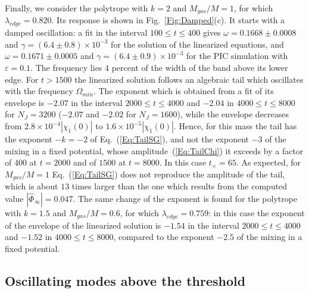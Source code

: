 Finally, we consider the polytrope with $k = 2$ and $M_{gas}/M = 1$, for which $\lambda_{edge} = 0.820$. Its response is shown in Fig.~\ref{Fig:Damped}(c). It starts with a damped oscillation: a fit in the interval $100\leq t\leq 400$ gives $\omega = 0.1668\pm 0.0008$ and $\gamma = (6.4\pm 0.8)\times 10^{-3}$ for the solution of the linearized equations, and $\omega = 0.1671\pm 0.0005$ and $\gamma = (6.4\pm 0.9)\times 10^{-3}$ for the PIC simulation with $\varepsilon = 0.1$. The frequency lies $4$ percent of the width of the band above its lower edge. For $t > 1500$ the linearized solution follows an algebraic tail which oscillates with the frequency $\Omega_{min}$. The exponent which is obtained from a fit of its envelope is $-2.07$ in the interval $2000\leq t\leq 4000$ and $-2.04$ in $4000\leq t\leq 8000$ for $N_J = 3200$ ($-2.07$ and $-2.02$ for $N_J = 1600$), while the envelope decreases from $2.8\times 10^{-4}|\chi_1(0)|$ to $1.6\times 10^{-5}|\chi_1(0)|$. Hence, for this mass the tail has the exponent $-k = -2$ of Eq.~(\ref{Eq:TailSG}), and not the exponent $-3$ of the mixing in a fixed potential, whose amplitude~(\ref{Eq:TailChi}) it exceeds by a factor of $400$ at $t = 2000$ and of $1500$ at $t = 8000$. In this case $t_\times = 65$. As expected, for $M_{gas}/M = 1$ Eq.~(\ref{Eq:TailSG}) does not reproduce the amplitude of the tail, which is about $13$ times larger than the one which results from the computed value $|\hat{\Phi}_\infty| = 0.047$. The same change of the exponent is found for the polytrope with $k = 1.5$ and $M_{gas}/M = 0.6$, for which $\lambda_{edge} = 0.759$: in this case the exponent of the envelope of the linearized solution is $-1.54$ in the interval $2000\leq t\leq 4000$ and $-1.52$ in $4000\leq t\leq 8000$, compared to the exponent $-2.5$ of the mixing in a fixed potential. 


\subsection{Oscillating modes above the threshold}
\label{SubSec:FixedLModes}

